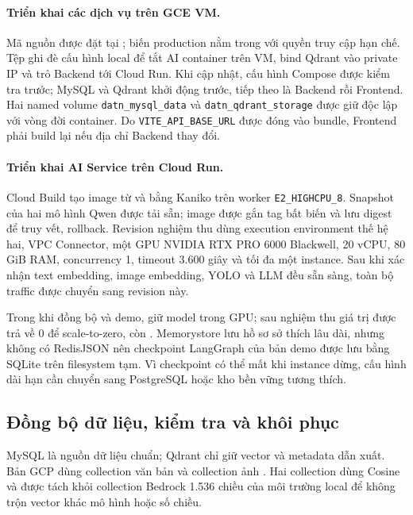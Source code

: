 \paragraph{Triển khai các dịch vụ trên GCE VM.}

Mã nguồn được đặt tại ; biến production nằm trong  với quyền truy cập hạn chế. Tệp  ghi đè cấu hình local để tắt AI container trên VM, bind Qdrant vào private IP và trỏ Backend tới Cloud Run. Khi cập nhật, cấu hình Compose được kiểm tra trước; MySQL và Qdrant khởi động trước, tiếp theo là Backend rồi Frontend. Hai named volume \texttt{datn\_mysql\_data} và \texttt{datn\_qdrant\_storage} được giữ độc lập với vòng đời container. Do \texttt{VITE\_API\_BASE\_URL} được đóng vào bundle, Frontend phải build lại nếu địa chỉ Backend thay đổi.

\paragraph{Triển khai AI Service trên Cloud Run.}

Cloud Build tạo image từ  và  bằng Kaniko trên worker \texttt{E2\_HIGHCPU\_8}. Snapshot của hai mô hình Qwen được tải sẵn; image được gắn tag bất biến và lưu digest để truy vết, rollback. Revision nghiệm thu  dùng execution environment thế hệ hai, VPC Connector, một GPU NVIDIA RTX PRO 6000 Blackwell, 20 vCPU, 80 GiB RAM, concurrency 1, timeout 3.600 giây và tối đa một instance. Sau khi  xác nhận text embedding, image embedding, YOLO và LLM đều sẵn sàng, toàn bộ traffic được chuyển sang revision này.

Trong khi đồng bộ và demo,  giữ model trong GPU; sau nghiệm thu giá trị được trả về 0 để scale-to-zero, còn . Memorystore lưu hồ sơ sở thích lâu dài, nhưng không có RedisJSON nên checkpoint LangGraph của bản demo được lưu bằng SQLite trên filesystem tạm. Vì checkpoint có thể mất khi instance dừng, cấu hình dài hạn cần chuyển sang PostgreSQL hoặc kho bền vững tương thích.

\subsection{Đồng bộ dữ liệu, kiểm tra và khôi phục}

MySQL là nguồn dữ liệu chuẩn; Qdrant chỉ giữ vector và metadata dẫn xuất. Bản GCP dùng collection văn bản  và collection ảnh . Hai collection dùng Cosine và được tách khỏi collection Bedrock 1.536 chiều của môi trường local để không trộn vector khác mô hình hoặc số chiều.

